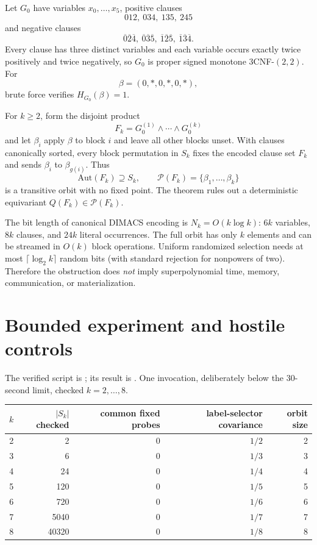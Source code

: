 \documentclass[11pt]{article}
\newcommand{\Aut}{\mathrm{Aut}}
\begin{document}
Let $G_0$ have variables $x_0,\ldots,x_5$, positive clauses
\[
012,\ 034,\ 135,\ 245
\]
and negative clauses
\[
\overline0\overline2\overline4,\ 
\overline0\overline3\overline5,\ 
\overline1\overline2\overline5,\ 
\overline1\overline3\overline4.
\]
Every clause has three distinct variables and each variable occurs exactly twice positively and twice negatively, so $G_0$ is proper signed monotone $3$CNF-$(2,2)$.  For
\[
 \beta=(0,*,0,*,0,*),
\]
brute force verifies $H_{G_0}(\beta)=1$.

For $k\ge2$, form the disjoint product
\[
 F_k=G_0^{(1)}\wedge\cdots\wedge G_0^{(k)}
\]
and let $\beta_i$ apply $\beta$ to block $i$ and leave all other blocks unset.  With clauses canonically sorted, every block permutation in $S_k$ fixes the encoded clause set $F_k$ and sends $\beta_i$ to $\beta_{g(i)}$.  Thus
\[
 \Aut(F_k)\supseteq S_k,
 \qquad
 \mathcal P(F_k)=\{\beta_1,\ldots,\beta_k\}
\]
is a transitive orbit with no fixed point.  The theorem rules out a deterministic equivariant $Q(F_k)\in\mathcal P(F_k)$.

The bit length of canonical DIMACS encoding is $N_k=O(k\log k)$: $6k$ variables, $8k$ clauses, and $24k$ literal occurrences.  The full orbit has only $k$ elements and can be streamed in $O(k)$ block operations.  Uniform randomized selection needs at most $\lceil\log_2 k\rceil$ random bits (with standard rejection for nonpowers of two).  Therefore the obstruction does \emph{not} imply superpolynomial time, memory, communication, or materialization.

\section{Bounded experiment and hostile controls}

The verified script is
; its result is
.
One invocation, deliberately below the 30-second limit, checked $k=2,\ldots,8$.

\begin{center}
\begin{tabular}{rrrrr}
\toprule
$k$ & $|S_k|$ checked & common fixed probes & label-selector covariance & orbit size \\
\midrule
2&2&0&$1/2$&2\\
3&6&0&$1/3$&3\\
4&24&0&$1/4$&4\\
5&120&0&$1/5$&5\\
6&720&0&$1/6$&6\\
7&5040&0&$1/7$&7\\
8&40320&0&$1/8$&8\\
\bottomrule
\end{tabular}
\end{center}
\end{document}
